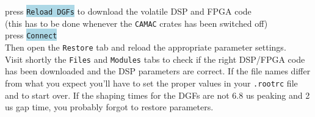 \documentclass[10pt]{article}
\newcommand{\blue}[1]{\colorbox{lightblue}{\texttt{#1}}}
\begin{document}
\hspace*{.2\linewidth}press \blue{Reload DGFs} to download the volatile DSP and FPGA code\\

(this has to be done whenever the \texttt{CAMAC} crates has been switched off)\\

\hspace*{.2\linewidth}press \blue{Connect} \\

Then open the \texttt{Restore} tab and reload the appropriate parameter settings.\\

Visit shortly the \texttt{Files} and \texttt{Modules} tabs
   to check if the right DSP/FPGA code has been downloaded and the DSP parameters
   are correct. If the file names differ from what you expect you'll
   have to set the proper values in your \texttt{.rootrc} file and to start over.
   If the shaping times for the DGFs are not 6.8 us peaking and 2 us gap time,
   you probably forgot to restore parameters.\\
\end{document}
